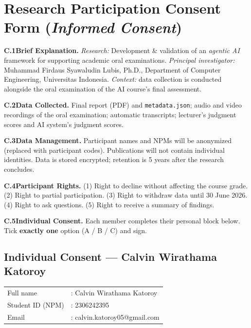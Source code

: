 \documentclass[11pt,a4paper,oneside]{report}
\begin{document}
\chapter{Research Participation Consent Form (\textit{Informed Consent})}
\label{lamp:consent}

{\small
\textbf{C.1\quad Brief Explanation.}
\textit{Research:} Development \& validation of an \textit{agentic AI} framework for supporting academic oral examinations.
\textit{Principal investigator:} Muhammad Firdaus Syawaludin Lubis, Ph.D., Department of Computer Engineering, Universitas Indonesia.
\textit{Context:} data collection is conducted alongside the oral examination of the AI course's final assessment.

\textbf{C.2\quad Data Collected.}
Final report (PDF) and \texttt{metadata.json}; audio and video recordings of the oral examination; automatic transcripts; lecturer's judgment scores and AI system's judgment scores.

\textbf{C.3\quad Data Management.}
Participant names and NPMs will be anonymized (replaced with participant codes). Publications will not contain individual identities. Data is stored encrypted; retention is 5 years after the research concludes.

\textbf{C.4\quad Participant Rights.}
(1) Right to decline without affecting the course grade. (2) Right to partial participation. (3) Right to withdraw data until 30 June 2026. (4) Right to ask questions. (5) Right to receive a summary of findings.

\textbf{C.5\quad Individual Consent.}
Each member completes their personal block below. Tick \textbf{exactly one} option (A / B / C) and sign.
}

\newpage
\section*{Individual Consent --- Calvin Wirathama Katoroy}

\noindent
\begin{tabular}{p{}p{}}
Full name        & : Calvin Wirathama Katoroy \\
Student ID (NPM) & : 2306242395 \\
Email            & : calvin.katoroy05@gmail.com \\
\end{tabular}

\vspace{1.5em}
\end{document}
